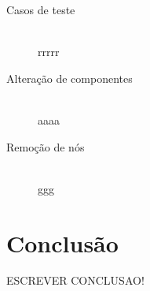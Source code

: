 \documentclass[12pt]{article}
\begin{document}
\begin{description} 
\item[Casos de teste] \hfill \\
rrrrr

\item[Alteração de componentes] \hfill \\
aaaa

\item[Remoção de nós] \hfill \\
ggg


\end{description}

\newpage

\section{Conclusão} 

ESCREVER CONCLUSAO! 


\end{document}
